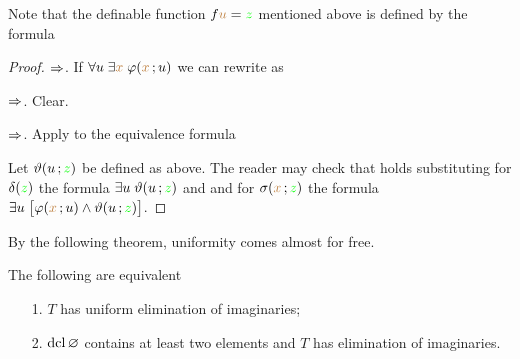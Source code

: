 \documentclass[creche.tex]{subfiles}
\begin{document}
Note that the definable function $f{\color{brown} u}={\color{green} z}$ mentioned above is defined by the formula 


\begin{proof}
$\Rightarrow$.
If $\forall u\;\exists{\color{brown}x}\;\varphi({\color{brown} x}\,;u)$ we can rewrite  as 


$\Rightarrow$.
Clear.

$\Rightarrow$.
Apply  to the equivalence formula


Let $\vartheta(u\,;{\color{green} z})$ be defined as above.
The reader may check that  holds substituting for $\delta({\color{green} z})$ the formula $\exists u\;\vartheta(u\,;{\color{green} z})$ and and for $\sigma({\color{brown} x}\,;{\color{green} z})$ the formula $\exists u\;\big[\varphi({\color{brown} x}\,;u)\wedge\vartheta(u\,;{\color{green} z})\big]$.
\end{proof}

By the following theorem, uniformity comes almost for free.

\begin{theorem}\label{thm_ei_unif} The following are equivalent
\begin{itemize}
\item[1.] $T$ has uniform elimination of imaginaries;
\item[2.] $\mathop{\rm dcl}\varnothing$ contains at least two elements and $T$ has elimination of imaginaries.
\end{itemize}
\end{theorem}

\end{document}
